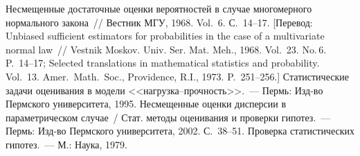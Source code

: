 \begin{multicols}{2}
{{\begin{thebibliography}{99}
Несмещенные достаточные оценки
вероятностей в случае многомерного нормального закона~// Вестник
МГУ, 1968. Vol.~6. С.~14--17.  [Перевод: 
Unbiased sufficient estimators for probabilities in the case of a
multivariate normal law~// Vestnik Moskov. Univ. Ser. Mat. Meh., 1968.
Vol.~23. No.\,6. P.~14--17; Selected translations in mathematical
statistics and probability. Vol.~13. Amer.\ Math.\ Soc.,
Providence, R.I., 1973. P.~251--256.]
Статистические задачи оценивания в
модели <<нагрузка--прочность>>.~--- Пермь: Изд-во Пермского университета, 1995.
Несмещенные оценки дисперсии в
параметрическом случае~/ Стат. методы оценивания и проверки
гипотез.~--- Пермь: Изд-во Пермского университета, 2002. С.~38--51. %
\label{end\stat}
Проверка статистических гипотез.~--- М.: Наука, 1979.
\end{thebibliography}

}
}
\end{multicols}